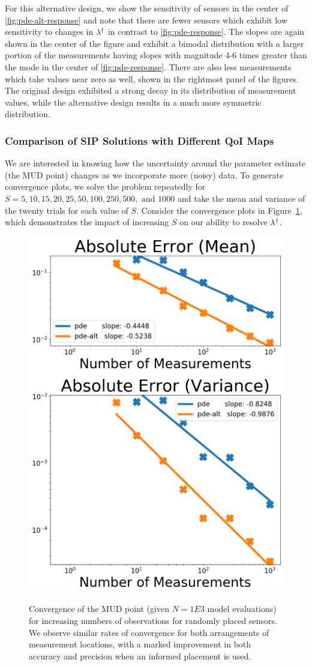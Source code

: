 For this alternative design, we show the sensitivity of sensors in the center of \ref{fig:pde-alt-response} and note that there are fewer sensors which exhibit low sensitivity to changes in $\lambda^\dagger$ in contrast to \ref{fig:pde-response}.
The slopes are again shown in the center of the figure and exhibit a bimodal distribution with a larger portion of the measurements having slopes with magnitude 4-6 times greater than the mode in the center of \ref{fig:pde-response}.
There are also less measurements which take values near zero as well, shown in the rightmost panel of the figures.
The original design exhibited a strong decay in its distribution of measurement values, while the alternative design results in a much more symmetric distribution.

\FloatBarrier
\subsubsection{Comparison of SIP Solutions with Different QoI Maps}

We are interested in knowing how the uncertainty around the parameter estimate (the MUD point) changes as we incorporate more (noisy) data.
To generate convergence plots, we solve the problem repeatedly for $S = 5, 10, 15, 20, 25, 50, 100, 250, 500, \text{ and } 1000$ and take the mean and variance of the twenty trials for each value of $S$.
Consider the convergence plots in Figure~\ref{fig:pde-convergence-obs}, which demonstrates the impact of increasing $S$ on our ability to resolve $\lambda^\dagger$.

\begin{figure}
  \centering
  \includegraphics[width=0.475\linewidth]{figures/pde/pde_convergence_mud_obs_mean}
  \includegraphics[width=0.475\linewidth]{figures/pde/pde_convergence_mud_obs_var}
  \caption{Convergence of the MUD point (given $N=1E3$ model evaluations) for increasing numbers of observations for randomly placed sensors.
  We observe similar rates of convergence for both arrangements of measurement locations, with a marked improvement in both accuracy and precision when an informed placement is used.
  }
  \label{fig:pde-convergence-obs}
\end{figure}

